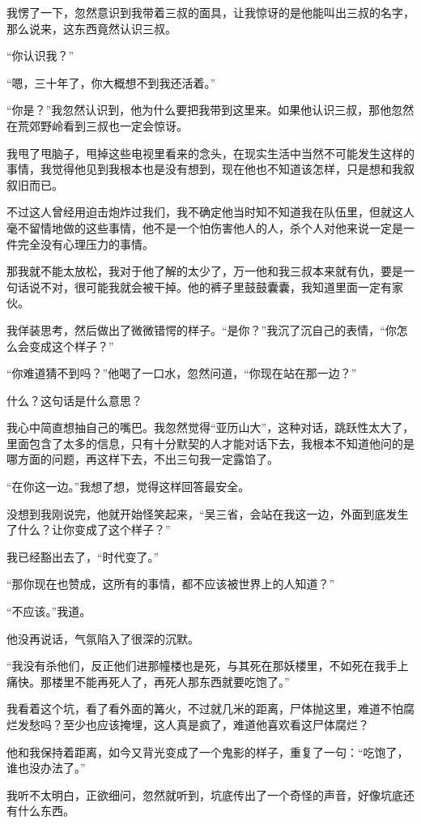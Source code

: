 我愣了一下，忽然意识到我带着三叔的面具，让我惊讶的是他能叫出三叔的名字，那么说来，这东西竟然认识三叔。

“你认识我？”

“嗯，三十年了，你大概想不到我还活着。”

“你是？”我忽然认识到，他为什么要把我带到这里来。如果他认识三叔，那他忽然在荒郊野岭看到三叔也一定会惊讶。

我甩了甩脑子，甩掉这些电视里看来的念头，在现实生活中当然不可能发生这样的事情，我觉得他见到我根本也是没有想到，现在他也不知道该怎样，只是想和我叙叙旧而已。

不过这人曾经用迫击炮炸过我们，我不确定他当时知不知道我在队伍里，但就这人毫不留情地做的这些事情，他不是一个怕伤害他人的人，杀个人对他来说一定是一件完全没有心理压力的事情。

那我就不能太放松，我对于他了解的太少了，万一他和我三叔本来就有仇，要是一句话说不对，很可能我就会被干掉。他的裤子里鼓鼓囊囊，我知道里面一定有家伙。

我佯装思考，然后做出了微微错愕的样子。“是你？”我沉了沉自己的表情，“你怎么会变成这个样子？”

“你难道猜不到吗？”他喝了一口水，忽然问道，“你现在站在那一边？”

什么？这句话是什么意思？

我心中简直想抽自己的嘴巴。我忽然觉得“亚历山大”，这种对话，跳跃性太大了，里面包含了太多的信息，只有十分默契的人才能对话下去，我根本不知道他问的是哪方面的问题，再这样下去，不出三句我一定露馅了。

“在你这一边。”我想了想，觉得这样回答最安全。

没想到我刚说完，他就开始怪笑起来，“吴三省，会站在我这一边，外面到底发生了什么？让你变成了这个样子？”

我已经豁出去了，“时代变了。”

“那你现在也赞成，这所有的事情，都不应该被世界上的人知道？”

“不应该。”我道。

他没再说话，气氛陷入了很深的沉默。

“我没有杀他们，反正他们进那幢楼也是死，与其死在那妖楼里，不如死在我手上痛快。那楼里不能再死人了，再死人那东西就要吃饱了。”

我看着这个坑，看了看外面的篝火，不过就几米的距离，尸体抛这里，难道不怕腐烂发愁吗？至少也应该掩埋，这人真是疯了，难道他喜欢看这尸体腐烂？

他和我保持着距离，如今又背光变成了一个鬼影的样子，重复了一句：“吃饱了，谁也没办法了。”

我听不太明白，正欲细问，忽然就听到，坑底传出了一个奇怪的声音，好像坑底还有什么东西。

